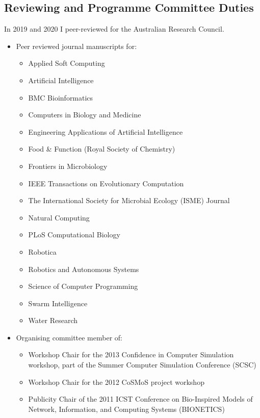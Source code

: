 \documentclass[a4paper]{article}
\begin{document}


\subsection*{Reviewing and Programme Committee Duties}

In 2019 and 2020 I peer-reviewed for the Australian Research Council.

\begin{itemize}
 \item Peer reviewed journal manuscripts for:
 \begin{itemize}
  \item Applied Soft Computing
  \item Artificial Intelligence
  \item BMC Bioinformatics
  \item Computers in Biology and Medicine
  \item Engineering Applications of Artificial Intelligence
  \item Food \& Function (Royal Society of Chemistry)
  \item Frontiers in Microbiology
  \item IEEE Transactions on Evolutionary Computation
  \item The International Society for Microbial Ecology (ISME) Journal
  \item Natural Computing
  \item PLoS Computational Biology
  \item Robotica
  \item Robotics and Autonomous Systems
  \item Science of Computer Programming
  \item Swarm Intelligence
  \item Water Research
  \end{itemize}


 \item Organising committee member of:
 \begin{itemize}
  \item Workshop Chair for the 2013 Confidence in Computer Simulation workshop, part of the Summer Computer Simulation Conference (SCSC)
  \item Workshop Chair for the 2012 CoSMoS project workshop
  \item Publicity Chair of the 2011 ICST Conference on Bio-Inspired Models of Network, Information, and Computing Systems (BIONETICS)
 \end{itemize}


\end{itemize}
\end{document}
